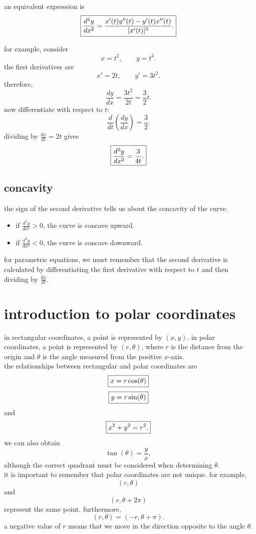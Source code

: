 \documentclass{article}
\newcommand{\mybox}[1]{\fbox{\ensuremath{\displaystyle #1}}}
\begin{document}
an equivalent expression is
\[
\mybox{
\frac{d^2y}{dx^2}
=
\frac{x'(t)y''(t)-y'(t)x''(t)}
{[x'(t)]^3}.
}
\]

for example, consider
\[
x=t^2,\qquad y=t^3.
\]
the first derivatives are
\[
x'=2t,\qquad y'=3t^2.
\]
therefore,
\[
\frac{dy}{dx}
=
\frac{3t^2}{2t}
=
\frac32t.
\]
now differentiate with respect to $t$:
\[
\frac{d}{dt}\left(\frac{dy}{dx}\right)
=
\frac32.
\]
dividing by $\frac{dx}{dt}=2t$ gives
\[
\mybox{
\frac{d^2y}{dx^2}
=
\frac{3}{4t}.
}
\]

\subsection{concavity}

the sign of the second derivative tells us about the concavity of the curve.

\begin{itemize}
\item if $\frac{d^2y}{dx^2}>0$, the curve is concave upward.
\item if $\frac{d^2y}{dx^2}<0$, the curve is concave downward.
\end{itemize}

for parametric equations, we must remember that the second derivative is calculated by differentiating the first derivative with respect to $t$ and then dividing by $\frac{dx}{dt}$.\\

\newpage

\section{introduction to polar coordinates}

in rectangular coordinates, a point is represented by $(x,y)$. in polar coordinates, a point is represented by $(r,\theta)$, where $r$ is the distance from the origin and $\theta$ is the angle measured from the positive $x$-axis.\\

the relationships between rectangular and polar coordinates are
\[
\mybox{x=r\cos(\theta)}
\]
\[
\mybox{y=r\sin(\theta)}
\]
and
\[
\mybox{x^2+y^2=r^2.}
\]
we can also obtain
\[
\tan(\theta)=\frac{y}{x},
\]
although the correct quadrant must be considered when determining $\theta$.\\

it is important to remember that polar coordinates are not unique. for example,
\[
(r,\theta)
\]
and
\[
(r,\theta+2\pi)
\]
represent the same point. furthermore,
\[
(r,\theta)=(-r,\theta+\pi).
\]
a negative value of $r$ means that we move in the direction opposite to the angle $\theta$.\\
\end{document}
